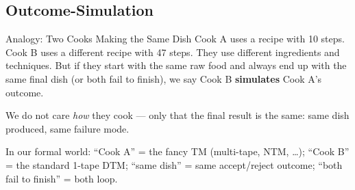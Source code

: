 \documentclass[11pt,a4paper]{article}
\begin{document}
\subsection{Outcome-Simulation} \label{sec:outcomesim}

\begin{notebox}{Analogy: Two Cooks Making the Same Dish}
Cook A uses a recipe with 10 steps. Cook B uses a different recipe with 47 steps. They use different ingredients and techniques. But if they start with the same raw food and always end up with the same final dish (or both fail to finish), we say Cook B \textbf{simulates} Cook A's outcome.

We do not care \textit{how} they cook --- only that the final result is the same: same dish produced, same failure mode.

In our formal world: ``Cook A'' = the fancy TM (multi-tape, NTM, \ldots); ``Cook B'' = the standard 1-tape DTM; ``same dish'' = same accept/reject outcome; ``both fail to finish'' = both loop.
\end{notebox}
\end{document}
